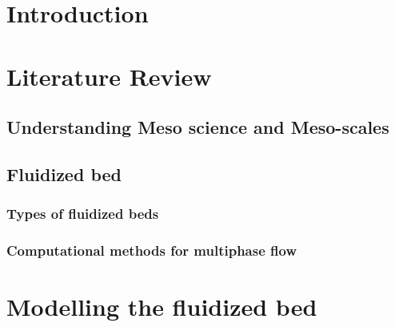 \documentclass[sprache=english,doktyp=marbeit,fontsize=12pt]{TUBAFarbeiten}
\begin{document}
\pagebreak


\tableofcontents
\pagebreak

\printunsrtglossary[type=symbols,style=symbunitlong]

\printacronyms[include=A,name=Abbreviations]
\acuseall

\pagebreak

\listoffigures
\listoftables

\pagebreak

\section{Introduction}



\pagebreak

\section{Literature Review}



\subsection{Understanding Meso science and Meso-scales}



\subsection{Fluidized bed}

\subsubsection{Types of fluidized beds}

\subsubsection{Computational methods for multiphase flow}



\pagebreak

\section{Modelling the fluidized bed}
\end{document}
